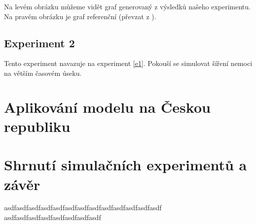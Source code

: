 \documentclass[a4paper,11pt]{article}
\begin{document}
			Na levém obrázku můžeme vidět graf generovaný z výsledků našeho experimentu. Na pravém obrázku je graf referenční (převzat z \cite{source}). 
			
		\subsection{Experiment 2}
			Tento experiment navazuje na experiment \ref{e1}. Pokouší se simulovat šíření nemoci na větším časovém úseku. 
		
	\section{Aplikování modelu na Českou republiku}
	
	\section{Shrnutí simulačních experimentů a závěr}
		asdfasdfasdfasdfasdfasdfasdfasdfasdfasdfasdfasdfasdf
		asdfasdfasdfasdfasdfasdfasdfasdf

	\newpage
	
	\renewcommand{\refname}{Literatura}
	
\end{document}
